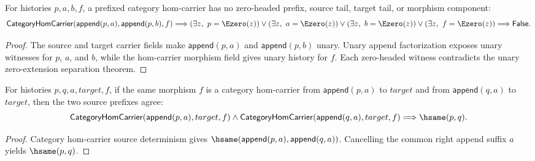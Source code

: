 \begin{theorem}
\label{thm:functor-prefix-hom-carrier-zero-headed-component-absurd}
For histories $p,a,b,f$, a prefixed category hom-carrier has no zero-headed
prefix, source tail, target tail, or morphism component:
$$
\mathsf{CategoryHomCarrier}(\mathsf{append}(p,a),\mathsf{append}(p,b),f)
\Longrightarrow
\left(
\exists z,\ p=\Ezero(z)
\right)
\lor
\left(
\exists z,\ a=\Ezero(z)
\right)
\lor
\left(
\exists z,\ b=\Ezero(z)
\right)
\lor
\left(
\exists z,\ f=\Ezero(z)
\right)
\Longrightarrow
\mathsf{False}.
$$
\end{theorem}
\begin{proof}
The source and target carrier fields make
$\mathsf{append}(p,a)$ and $\mathsf{append}(p,b)$ unary. Unary append
factorization exposes unary witnesses for $p$, $a$, and $b$, while the
hom-carrier morphism field gives unary history for $f$. Each zero-headed
witness contradicts the unary zero-extension separation theorem.
\end{proof}

\begin{theorem}
\label{thm:functor-prefix-hom-carrier-source-prefix-deterministic}
For histories $p,q,a,target,f$, if the same morphism $f$ is a category
hom-carrier from $\mathsf{append}(p,a)$ to $target$ and from
$\mathsf{append}(q,a)$ to $target$, then the two source prefixes agree:
$$
\mathsf{CategoryHomCarrier}(\mathsf{append}(p,a),target,f)
\land
\mathsf{CategoryHomCarrier}(\mathsf{append}(q,a),target,f)
\Longrightarrow
\hsame(p,q).
$$
\end{theorem}
\begin{proof}
Category hom-carrier source determinism gives
$\hsame(\mathsf{append}(p,a),\mathsf{append}(q,a))$. Cancelling the common
right append suffix $a$ yields $\hsame(p,q)$.
\end{proof}


